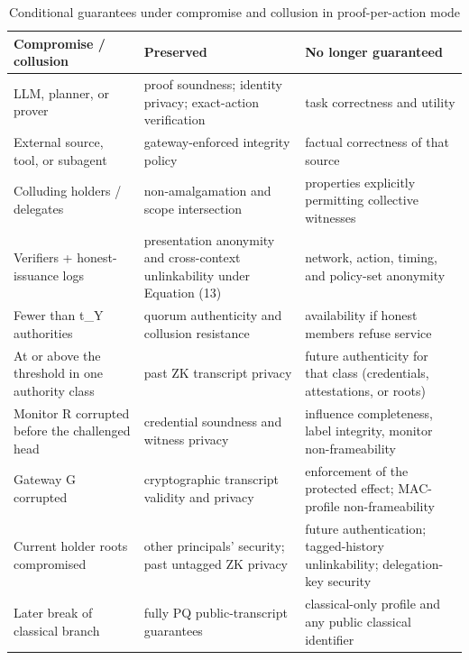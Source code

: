 \begin{table}[t]
\centering
\caption{Conditional guarantees under compromise and collusion in proof-per-action mode}
\begin{tabular}{lll}
\hline
Compromise / collusion & Preserved & No longer guaranteed \\
\hline
LLM, planner, or prover & proof soundness; identity privacy; exact-action verification & task correctness and utility \\
External source, tool, or subagent & gateway-enforced integrity policy & factual correctness of that source \\
Colluding holders / delegates & non-amalgamation and scope intersection & properties explicitly permitting collective witnesses \\
Verifiers + honest-issuance logs & presentation anonymity and cross-context unlinkability under Equation (13) & network, action, timing, and policy-set anonymity \\
Fewer than t\_Y authorities & quorum authenticity and collusion resistance & availability if honest members refuse service \\
At or above the threshold in one authority class & past ZK transcript privacy & future authenticity for that class (credentials, attestations, or roots) \\
Monitor R corrupted before the challenged head & credential soundness and witness privacy & influence completeness, label integrity, monitor non-frameability \\
Gateway G corrupted & cryptographic transcript validity and privacy & enforcement of the protected effect; MAC-profile non-frameability \\
Current holder roots compromised & other principals' security; past untagged ZK privacy & future authentication; tagged-history unlinkability; delegation-key security \\
Later break of classical branch & fully PQ public-transcript guarantees & classical-only profile and any public classical identifier \\
\hline
\end{tabular}
\end{table}
